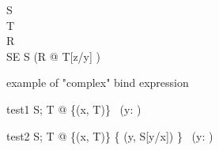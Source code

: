 

\begin{zed}
   S 
\\
   T 
\\
   R 
\\
   SE  S \lor (\exists \Delta R @ T[z/y] \land [ a, a': \nat | a = z \land a' = z' ])
\end{zed}

example of "complex" bind expression

\begin{theorem}{test1}
  \forall S; T @ \{(x, \theta T)\} \in \power~(\nat \cross \lblot y: \nat \rblot)
\end{theorem}

\begin{theorem}{test2}
  \forall S; T @ \{(x, \theta T)\} \cup \{ (y, \theta S[y/x]) \} \in \power~(\nat \cross \lblot y: \nat \rblot)
\end{theorem}
